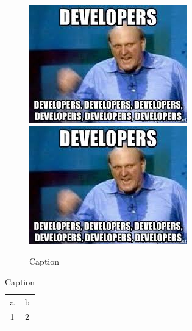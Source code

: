 \documentclass[12pt]{article}
\begin{document}
\begin{figure}[h]
    \centering
    \includegraphics[width=0.5\linewidth]{download.jpg}%
    \includegraphics[width=0.5\linewidth]{download.jpg}
    \caption{Caption}
    \label{fig:my_label}
\end{figure}
\begin{table}[h]
    \centering
    \begin{tabular}{cc}
        a & b\\
        1 & 2
    \end{tabular}
    \caption{Caption}
    \label{tab:my_label}
\end{table}


\printbibliography
\end{document}
